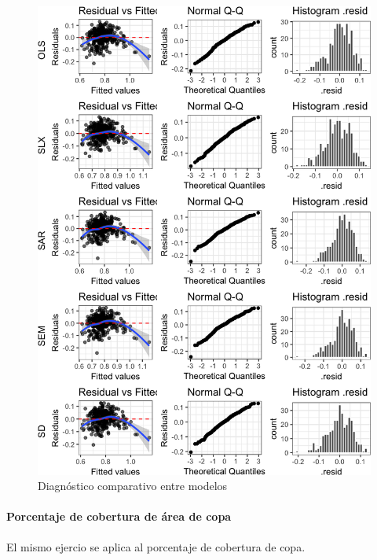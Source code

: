 \documentclass[12pt,]{book}
\newenvironment{Shaded}{\begin{snugshade}}{\end{snugshade}}
\newcommand{\KeywordTok}[1]{\textcolor[rgb]{0.13,0.29,0.53}{\textbf{#1}}}
\newcommand{\DataTypeTok}[1]{\textcolor[rgb]{0.13,0.29,0.53}{#1}}
\newcommand{\FloatTok}[1]{\textcolor[rgb]{0.00,0.00,0.81}{#1}}
\newcommand{\StringTok}[1]{\textcolor[rgb]{0.31,0.60,0.02}{#1}}
\newcommand{\CommentTok}[1]{\textcolor[rgb]{0.56,0.35,0.01}{\textit{#1}}}
\newcommand{\OperatorTok}[1]{\textcolor[rgb]{0.81,0.36,0.00}{\textbf{#1}}}
\newcommand{\NormalTok}[1]{#1}
\let\oldparagraph\paragraph
\renewcommand{\paragraph}[1]{\oldparagraph{#1}\mbox{}}
\begin{document}
\begin{figure}
\includegraphics[width=1\linewidth]{tesis-unigis_files/figure-latex/diag-model-espaciales-1} \caption{Diagnóstico comparativo entre modelos}\label{fig:diag-model-espaciales}
\end{figure}

\paragraph{Porcentaje de cobertura de área de
copa}\label{porcentaje-de-cobertura-de-area-de-copa}

El mismo ejercio se aplica al porcentaje de cobertura de copa.

\begin{Shaded}
\end{Shaded}
\end{document}
